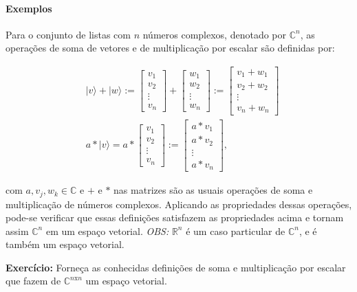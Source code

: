 \documentclass[11pt]{article}
\begin{document}
    \paragraph{Exemplos}\label{exemplos}

Para o conjunto de listas com \(n\) números complexos, denotado por
\(\mathbb{C}^{n}\), as operações de soma de vetores e de multiplicação
por escalar são definidas por:

\begin{align}
& |v\rangle+|w\rangle:=\begin{bmatrix} v_{1} \\ v_{2} \\ \vdots \\ v_{n} \end{bmatrix} + \begin{bmatrix} w_{1} \\ w_{2} \\ \vdots \\ w_{n} \end{bmatrix} := \begin{bmatrix} v_{1}+w_{1} \\ v_{2}+w_{2} \\ \vdots \\ v_{n}+w_{n} \end{bmatrix} \\
& a*|v\rangle = a*\begin{bmatrix} v_{1} \\ v_{2} \\ \vdots \\ v_{n} \end{bmatrix} := \begin{bmatrix} a*v_{1} \\ a*v_{2} \\ \vdots \\ a*v_{n} \end{bmatrix},
\end{align}

com \(a,v_{j},w_{k}\in\mathbb{C}\) e \(+\) e \(*\) nas matrizes são as
usuais operações de soma e multiplicação de números complexos. Aplicando
as propriedades dessas operações, pode-se verificar que essas definições
satisfazem as propriedades acima e tornam assim \(\mathbb{C}^{n}\) em um
espaço vetorial. \emph{OBS:} \(\mathbb{R}^{n}\) é um caso particular de
\(\mathbb{C}^{n}\), e é também um espaço vetorial.

\textbf{Exercício:} Forneça as conhecidas definições de soma e
multiplicação por escalar que fazem de \(\mathbb{C}^{n\text{x}n}\) um
espaço vetorial.
\end{document}
